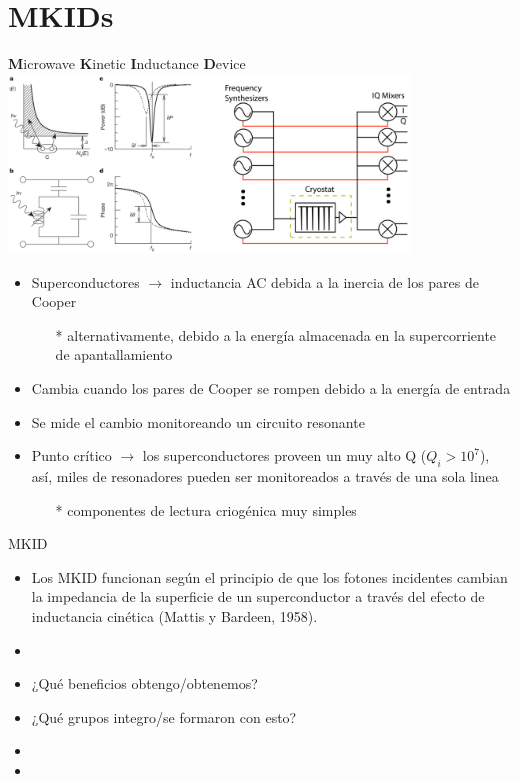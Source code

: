 \documentclass[ignorenonframetext,12pt]{beamer}
\begin{document}
\section{MKIDs}
\begin{frame}{\textbf{M}icrowave \textbf{K}inetic \textbf{I}nductance \textbf{D}evice}
				\centering
												\includegraphics[width=0.8\textwidth]{concepto_mkid1}
				\begin{itemize}
								\item \footnotesize{Superconductores $\to$ inductancia AC debida a la
												inercia de los pares de Cooper}
												\begin{itemize}
																\item[*] \scriptsize{{\color{blue}alternativamente, debido a la
																				energía almacenada en la supercorriente
																				de apantallamiento}}
												\end{itemize}
								\item Cambia cuando los pares de Cooper se rompen debido a la
												energía de entrada
								\item Se mide el cambio monitoreando un circuito resonante
								\item Punto crítico $\to$ los superconductores proveen un muy
												alto Q ($Q_i > 10^7$), así, miles de resonadores
												pueden ser monitoreados a través de una sola linea 
												\begin{itemize}
																\item[*] \scriptsize{{\color{blue}componentes de lectura criogénica muy
																				simples}}
												\end{itemize}
				\end{itemize}

\end{frame}

\begin{frame}{MKID}
				\begin{itemize}
								\item Los MKID funcionan según el principio de que los fotones
												incidentes \alert{cambian la impedancia de la superficie de un
												superconductor a través del efecto de inductancia
												cinética} (Mattis y Bardeen, 1958).
								\item 
								\item ¿Qué beneficios obtengo/obtenemos?
								\item ¿Qué grupos integro/se formaron con esto?
								\item 
								\item 
				\end{itemize}

\end{frame}
\end{document}
